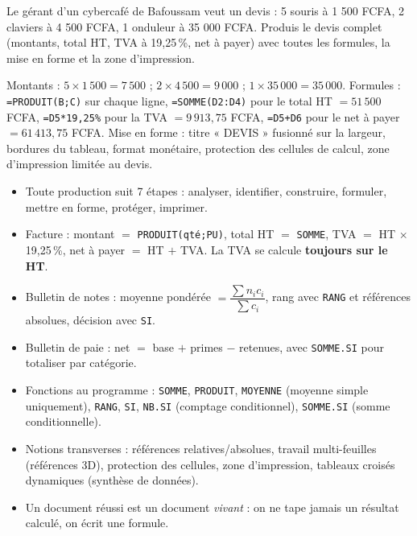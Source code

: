\documentclass[11pt]{article}
\begin{document}
\begin{exercice}
Le gérant d'un cybercafé de Bafoussam veut un devis : 5 souris à 1 500 FCFA, 2 claviers à 4 500 FCFA, 1 onduleur à 35 000 FCFA. Produis le devis complet (montants, total HT, TVA à 19,25\,\%, net à payer) avec toutes les formules, la mise en forme et la zone d'impression.
\end{exercice}

\begin{corrige}
Montants : $5 \times 1\,500 = 7\,500$ ; $2 \times 4\,500 = 9\,000$ ; $1 \times 35\,000 = 35\,000$. Formules : \texttt{=PRODUIT(B;C)} sur chaque ligne, \texttt{=SOMME(D2:D4)} pour le total HT $= 51\,500$ FCFA, \texttt{=D5*19,25\%} pour la TVA $= 9\,913{,}75$ FCFA, \texttt{=D5+D6} pour le net à payer $= 61\,413{,}75$ FCFA. Mise en forme : titre « DEVIS » fusionné sur la largeur, bordures du tableau, format monétaire, protection des cellules de calcul, zone d'impression limitée au devis.
\end{corrige}

\begin{aretenir}
\begin{itemize}
  \item Toute production suit 7 étapes : analyser, identifier, construire, formuler, mettre en forme, protéger, imprimer.
  \item Facture : montant $=$ \texttt{PRODUIT(qté;PU)}, total HT $=$ \texttt{SOMME}, TVA $=$ HT $\times$ 19,25\,\%, net à payer $=$ HT $+$ TVA. La TVA se calcule \textbf{toujours sur le HT}.
  \item Bulletin de notes : moyenne pondérée $= \dfrac{\sum n_i c_i}{\sum c_i}$, rang avec \texttt{RANG} et références absolues, décision avec \texttt{SI}.
  \item Bulletin de paie : net $=$ base $+$ primes $-$ retenues, avec \texttt{SOMME.SI} pour totaliser par catégorie.
  \item Fonctions au programme : \texttt{SOMME}, \texttt{PRODUIT}, \texttt{MOYENNE} (moyenne simple uniquement), \texttt{RANG}, \texttt{SI}, \texttt{NB.SI} (comptage conditionnel), \texttt{SOMME.SI} (somme conditionnelle).
  \item Notions transverses : références relatives/absolues, travail multi-feuilles (références 3D), protection des cellules, zone d'impression, tableaux croisés dynamiques (synthèse de données).
  \item Un document réussi est un document \emph{vivant} : on ne tape jamais un résultat calculé, on écrit une formule.
\end{itemize}
\end{aretenir}
\end{document}
